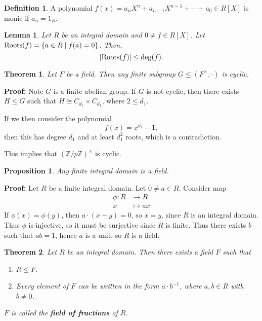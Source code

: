 \documentclass[12pt]{article}
\newtheorem{theorem}{Theorem}[section]
\newtheorem{lemma}{Lemma}[section]
\newtheorem{proposition}{Proposition}[section]
\theoremstyle{definition}
\newtheorem{definition}{Definition}[section]
\theoremstyle{remark}
\begin{document}
\begin{definition}
	A polynomial $f(x) = a_nX^{n} + a_{n-1}X^{n-1} + \cdots + a_0 \in R[X]$ is monic if $a_n = 1_{R}$.
\end{definition}

\begin{lemma}
	Let $R$ be an integral domain and $0 \neq f \in R[X]$. Let $\text{\normalfont Roots}(f) = \{a \in R \mid f(a) = 0\}$. Then,
	\[
		|\text{\normalfont Roots}(f)| \leq \deg(f)
	.\]
\end{lemma}

\begin{theorem}
	Let $F$ be a field. Then any finite subgroup $G \leq (F^{\times}, \cdot)$ is cyclic.
\end{theorem}

\begin{adjustbox}{minipage = \columnwidth - 25.5pt, margin=1em, frame=1pt, margin=0em}
	\textbf{Proof:} Note $G$ is a finite abelian group. If $G$ is not cyclic, then there exists $H \leq G$ such that $H \cong C_{d_1} \times C_{d_1}$, where $2 \leq d_1$.

	If we then consider the polynomial
	\[
		f(x) = x^{d_1} - 1
	,\]
	then this has degree $d_1$ and at least $d_1^2$ roots, which is a contradiction.
\end{adjustbox}

This implies that $(\mathbb{Z} / p \mathbb{Z})^{\times}$ is cyclic.

\begin{proposition}
	Any finite integral domain is a field.
\end{proposition}

\begin{adjustbox}{minipage = \columnwidth - 25.5pt, margin=1em, frame=1pt, margin=0em}
	\textbf{Proof:} Let $R$ be a finite integral domain. Let $0 \neq a \in R$. Consider map
	\begin{align*}
		\phi : R &\to R \\
		x &\mapsto ax
	\end{align*}
	If $\phi(x) = \phi(y)$, then $a \cdot (x - y) = 0$, so $x = y$, since $R$ is an integral domain. Thus $\phi$ is injective, so it must be surjective since $R$ is finite. Thus there exists $b$ such that $ab = 1$, hence $a$ is a unit, so $R$ is a field.
\end{adjustbox}

\begin{theorem}
	Let $R$ be an integral domain. Then there exists a field $F$ such that
	\begin{enumerate}[\normalfont(i)]
		\item $R \leq F$.
		\item Every element of $F$ can be written in the form $a \cdot b^{-1}$, where $a, b \in R$ with $b \neq 0$.
	\end{enumerate}
	$F$ is called the \textbf{field of fractions} of $R$.
\end{theorem}
\end{document}
